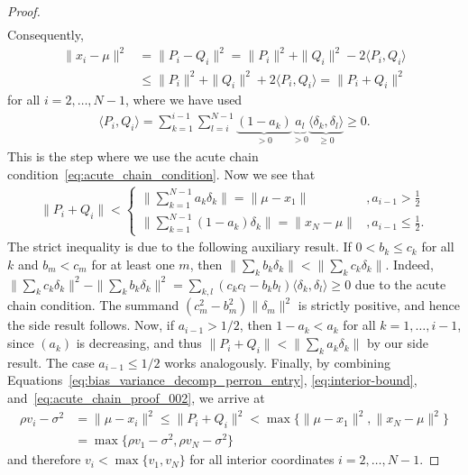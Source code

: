 \begin{proof}
\begin{align*}
    \end{align*}
    Consequently,
    \begin{equation}\label{eq:interior-bound}
        \begin{aligned}
            \|x_i-\mu\|^2&=\|P_i-Q_i\|^2=\|P_i\|^2+\|Q_i\|^2-2\langle P_i,Q_i\rangle\\&
            \le\|P_i\|^2+\|Q_i\|^2+2\langle P_i,Q_i\rangle=\|P_i+Q_i\|^2
        \end{aligned}
    \end{equation}
    for all $i=2,\dots,N-1$, where we have used
    \begin{align*}
        \langle P_i,Q_i\rangle=\sum_{k=1}^{i-1}\sum_{l=i}^{N-1}\underbrace{(1-a_k)}_{>0}\underbrace{a_l}_{>0}\underbrace{\langle\delta_k,\delta_l\rangle}_{\ge0}\ge0.
    \end{align*}
    This is the step where we use the acute chain condition~\eqref{eq:acute_chain_condition}. Now we see that
    \begin{align}\label{eq:acute_chain_proof_002}
        \|P_i+Q_i\|<\begin{cases}
            \|\sum_{k=1}^{N-1}a_k\delta_k\|=\|\mu-x_1\| & ,a_{i-1}>\frac{1}{2}\\
            \|\sum_{k=1}^{N-1}(1-a_k)\delta_k\|=\|x_N-\mu\| & ,a_{i-1}\le\frac{1}{2}.
        \end{cases}
    \end{align}
    The strict inequality is due to the following auxiliary result. If $0<b_k\le c_k$ for all $k$ and $b_m<c_m$ for at least one $m$, then $\|\sum_kb_k\delta_k\|<\|\sum_kc_k\delta_k\|$. Indeed, $\|\sum_kc_k\delta_k\|^2-\|\sum_kb_k\delta_k\|^2=\sum_{k,l}(c_kc_l-b_kb_l)\langle\delta_k,\delta_l\rangle\ge0$ due to the acute chain condition. The summand $(c_m^2-b_m^2)\|\delta_m\|^2$ is strictly positive, and hence the side result follows. Now, if $a_{i-1}>1/2$, then $1-a_k<a_k$ for all $k=1,\dots,i-1$, since $(a_k)$ is decreasing, and thus $\|P_i+Q_i\|<\|\sum_ka_k\delta_k\|$ by our side result. The case $a_{i-1}\le1/2$ works analogously. Finally, by combining Equations~\eqref{eq:bias_variance_decomp_perron_entry}, \eqref{eq:interior-bound}, and~\eqref{eq:acute_chain_proof_002}, we arrive at
    \begin{align*}
        \rho v_i-\sigma^2&=\|\mu-x_i\|^2\le\|P_i+Q_i\|^2<\max\{\|\mu-x_1\|^2,\|x_N-\mu\|^2\}\\&
        =\max\{\rho v_1-\sigma^2,\rho v_N-\sigma^2\}
    \end{align*}
    and therefore $v_i<\max\{v_1,v_N\}$ for all interior coordinates $i=2,\dots,N-1$.
\end{proof}

